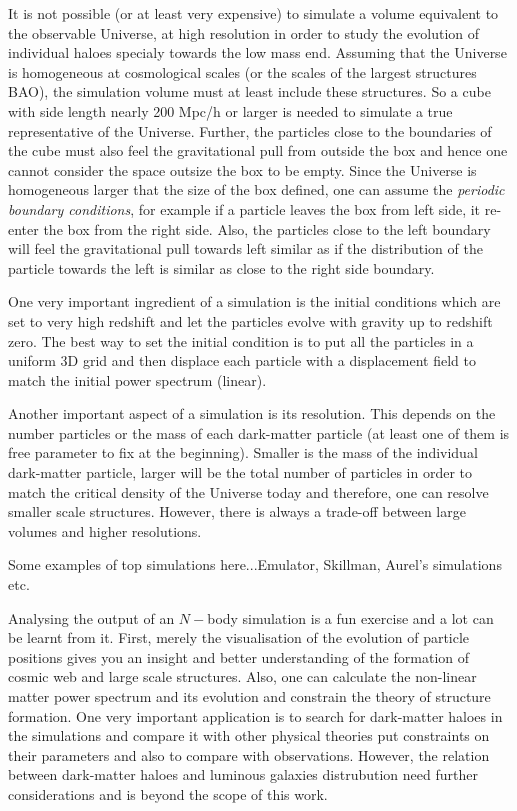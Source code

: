 It is not possible (or at least very expensive) to simulate a volume equivalent to the
observable Universe, at high resolution in order to study the evolution of individual
haloes specialy towards the low mass end. Assuming that the Universe is homogeneous
at cosmological scales (or the scales of the largest structures BAO), the simulation
volume must at least include these structures. So a cube with side length nearly 200 Mpc/h
or larger is needed to simulate a true representative of the Universe. Further, the
particles close to the boundaries of the cube must also feel the gravitational pull
from outside the box and hence one cannot consider the space outsize the box to be 
empty. Since the Universe is homogeneous larger that the size of the box defined, one
can assume the {\it periodic boundary conditions}, for example if a particle leaves the box from left
side, it re-enter the box from the right side. Also, the particles close to the left boundary
will feel the gravitational pull towards left similar as if the distribution of the particle
towards the left is similar as close to the right side boundary.

One very important ingredient of a simulation is the initial conditions which are
set to very high redshift and let the particles evolve with gravity up to redshift zero. 
The best way to set the initial condition is to put all the particles in a uniform 3D grid
and then displace each particle with a displacement field to match the initial power 
spectrum (linear). 

Another important aspect of a simulation is its resolution. This depends on the number 
particles or the mass of each dark-matter particle (at least one of them is free parameter 
to fix at the beginning). Smaller is the mass of the individual dark-matter particle, 
larger will be the total number of particles in order to match the critical density of 
the Universe today and therefore, one can resolve smaller scale structures. However, 
there is always a trade-off between large volumes and higher resolutions. 

Some examples of top simulations here...Emulator, Skillman, Aurel's simulations etc. 

Analysing the output of an $N-$body simulation is a fun exercise and a lot can be learnt
from it. First, merely the visualisation of the evolution of particle positions gives
you an insight and better understanding of the formation of cosmic web and large
scale structures. Also, one can calculate the non-linear matter power spectrum and its
evolution and constrain the theory of structure formation. One very important
application is to search for dark-matter haloes in the simulations and compare
it with other physical theories put constraints on their parameters and also
to compare with observations. However, the relation between dark-matter haloes
and luminous galaxies distrubution need further considerations and is beyond
the scope of this work. 

